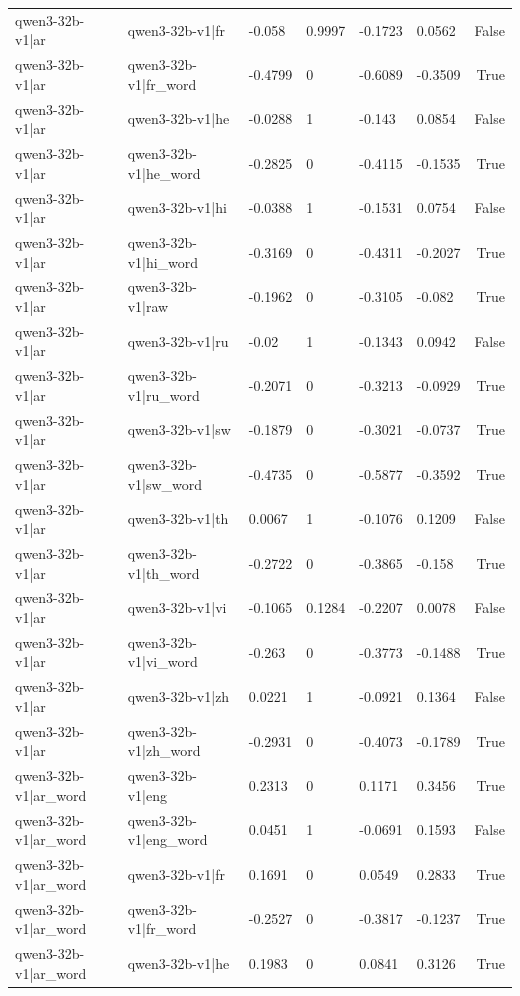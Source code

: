 \begin{table}
\begin{tabular}{llllllr}
qwen3-32b-v1|ar & qwen3-32b-v1|fr & -0.058 & 0.9997 & -0.1723 & 0.0562 & False \\
qwen3-32b-v1|ar & qwen3-32b-v1|fr_word & -0.4799 & 0 & -0.6089 & -0.3509 & True \\
qwen3-32b-v1|ar & qwen3-32b-v1|he & -0.0288 & 1 & -0.143 & 0.0854 & False \\
qwen3-32b-v1|ar & qwen3-32b-v1|he_word & -0.2825 & 0 & -0.4115 & -0.1535 & True \\
qwen3-32b-v1|ar & qwen3-32b-v1|hi & -0.0388 & 1 & -0.1531 & 0.0754 & False \\
qwen3-32b-v1|ar & qwen3-32b-v1|hi_word & -0.3169 & 0 & -0.4311 & -0.2027 & True \\
qwen3-32b-v1|ar & qwen3-32b-v1|raw & -0.1962 & 0 & -0.3105 & -0.082 & True \\
qwen3-32b-v1|ar & qwen3-32b-v1|ru & -0.02 & 1 & -0.1343 & 0.0942 & False \\
qwen3-32b-v1|ar & qwen3-32b-v1|ru_word & -0.2071 & 0 & -0.3213 & -0.0929 & True \\
qwen3-32b-v1|ar & qwen3-32b-v1|sw & -0.1879 & 0 & -0.3021 & -0.0737 & True \\
qwen3-32b-v1|ar & qwen3-32b-v1|sw_word & -0.4735 & 0 & -0.5877 & -0.3592 & True \\
qwen3-32b-v1|ar & qwen3-32b-v1|th & 0.0067 & 1 & -0.1076 & 0.1209 & False \\
qwen3-32b-v1|ar & qwen3-32b-v1|th_word & -0.2722 & 0 & -0.3865 & -0.158 & True \\
qwen3-32b-v1|ar & qwen3-32b-v1|vi & -0.1065 & 0.1284 & -0.2207 & 0.0078 & False \\
qwen3-32b-v1|ar & qwen3-32b-v1|vi_word & -0.263 & 0 & -0.3773 & -0.1488 & True \\
qwen3-32b-v1|ar & qwen3-32b-v1|zh & 0.0221 & 1 & -0.0921 & 0.1364 & False \\
qwen3-32b-v1|ar & qwen3-32b-v1|zh_word & -0.2931 & 0 & -0.4073 & -0.1789 & True \\
qwen3-32b-v1|ar_word & qwen3-32b-v1|eng & 0.2313 & 0 & 0.1171 & 0.3456 & True \\
qwen3-32b-v1|ar_word & qwen3-32b-v1|eng_word & 0.0451 & 1 & -0.0691 & 0.1593 & False \\
qwen3-32b-v1|ar_word & qwen3-32b-v1|fr & 0.1691 & 0 & 0.0549 & 0.2833 & True \\
qwen3-32b-v1|ar_word & qwen3-32b-v1|fr_word & -0.2527 & 0 & -0.3817 & -0.1237 & True \\
qwen3-32b-v1|ar_word & qwen3-32b-v1|he & 0.1983 & 0 & 0.0841 & 0.3126 & True \\

\end{tabular}
\end{table}
